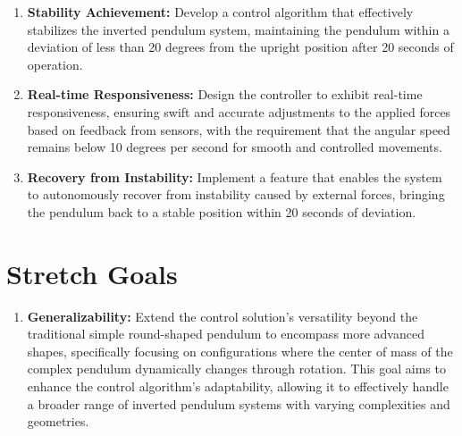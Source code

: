 \documentclass{article}
\begin{document}
\begin{enumerate}
    \item \textbf{Stability Achievement:}
    Develop a control algorithm that effectively stabilizes
    the inverted pendulum system, maintaining the pendulum
    within a deviation of less than 20 degrees from the upright position
    after 20 seconds of operation.

    \item \textbf{Real-time Responsiveness:}
    Design the controller to exhibit real-time responsiveness,
    ensuring swift and accurate adjustments to the applied forces
    based on feedback from sensors, with the requirement that the angular speed
    remains below 10 degrees per second for smooth and controlled movements.

    \item \textbf{Recovery from Instability:}
    Implement a feature that enables the system to autonomously recover
    from instability caused by external forces, bringing the pendulum back
    to a stable position within 20 seconds of deviation.
\end{enumerate}

\section{Stretch Goals}
\begin{enumerate}
    \item \textbf{Generalizability:}
    Extend the control solution's versatility beyond the traditional
    simple round-shaped pendulum to encompass more advanced shapes,
    specifically focusing on configurations where the center of
    mass of the complex pendulum dynamically changes through rotation.
    This goal aims to enhance the control algorithm's adaptability,
    allowing it to effectively handle a broader range of inverted
    pendulum systems with varying complexities and geometries.
\end{enumerate}
\end{document}
